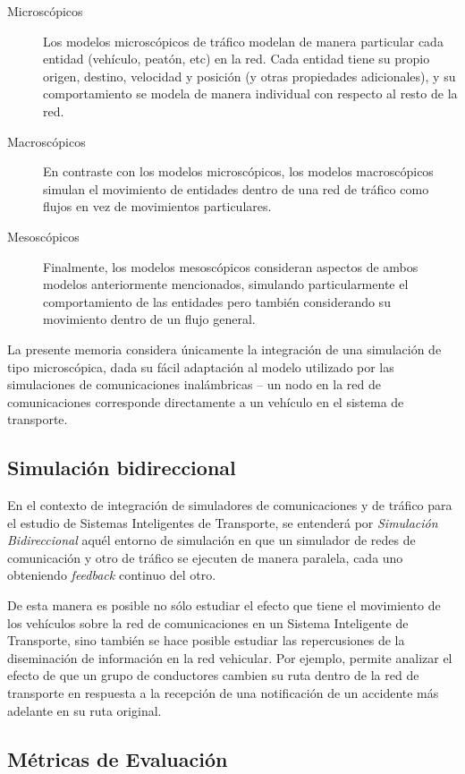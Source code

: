 \begin{description}
    \item[Microscópicos] Los modelos microscópicos de tráfico modelan de manera particular cada entidad (vehículo, peatón, etc) en la red. Cada entidad tiene su propio origen, destino, velocidad y posición (y otras propiedades adicionales), y su comportamiento se modela de manera individual con respecto al resto de la red. 
    \item[Macroscópicos] En contraste con los modelos microscópicos, los modelos macroscópicos simulan el movimiento de entidades dentro de una red de tráfico como flujos en vez de movimientos particulares.
    \item[Mesoscópicos] Finalmente, los modelos mesoscópicos consideran aspectos de ambos modelos anteriormente mencionados, simulando particularmente el comportamiento de las entidades pero también considerando su movimiento dentro de un flujo general.
\end{description}

La presente memoria considera únicamente la integración de una simulación de tipo microscópica, dada su fácil adaptación al modelo utilizado por las simulaciones de comunicaciones inalámbricas -- un nodo en la red de comunicaciones corresponde directamente a un vehículo en el sistema de transporte.

\subsection{Simulación bidireccional}

En el contexto de integración de simuladores de comunicaciones y de tráfico para el estudio de Sistemas Inteligentes de Transporte, se entenderá por \emph{Simulación Bidireccional} aquél entorno de simulación en que un simulador de redes de comunicación y otro de tráfico se ejecuten de manera paralela, cada uno obteniendo \emph{feedback} continuo del otro.

De esta manera es posible no sólo estudiar el efecto que tiene el movimiento de los vehículos sobre la red de comunicaciones en un Sistema Inteligente de Transporte, sino también se hace posible estudiar las repercusiones de la diseminación de información en la red vehicular. Por ejemplo, permite analizar el efecto de que un grupo de conductores cambien su ruta dentro de la red de transporte en respuesta a la recepción de una notificación de un accidente más adelante en su ruta original.

\subsection{Métricas de Evaluación}\label{sec:eval_metrics}

